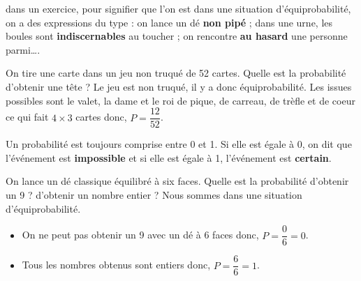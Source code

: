 \begin{remarque}
   dans un exercice, pour signifier que l'on est dans une situation d'équiprobabilité, on a des expressions du type : \og on lance un dé \textbf{non pipé} \fg ; \og dans une urne, les boules sont \textbf{indiscernables} au toucher \fg ; \og on rencontre \textbf{au hasard} une personne parmi\dots \fg.
\end{remarque}

\begin{exemple}
   On tire une carte dans un jeu non truqué de 52 cartes. Quelle est la probabilité d'obtenir une tête ?
   \correction
      Le jeu est non truqué, il y a donc équiprobabilité. Les issues possibles sont le valet, la dame et le roi de pique, de carreau, de trèfle et de coeur ce qui fait $4\times3$ cartes donc, $P =\dfrac{12}{52}$.
\end{exemple}

\begin{propriete}
   Un probabilité est toujours comprise entre 0 et 1. Si elle est égale à 0, on dit que l'événement est {\bf impossible} et si elle est égale à 1, l'événement est {\bf certain}.
\end{propriete}

\begin{exemple}
   On lance un dé classique équilibré à six faces. Quelle est la probabilité d'obtenir un 9 ? d'obtenir un nombre entier ?
\correction
   Nous sommes dans une situation d'équiprobabilité.
   \begin{itemize} 
      \item On ne peut pas obtenir un 9 avec un dé à 6 faces donc, $P =\dfrac06 =0$.
      \item Tous les nombres obtenus sont entiers donc, $P =\dfrac66 =1$.
   \end{itemize}
\end{exemple}



\exercicesbase

